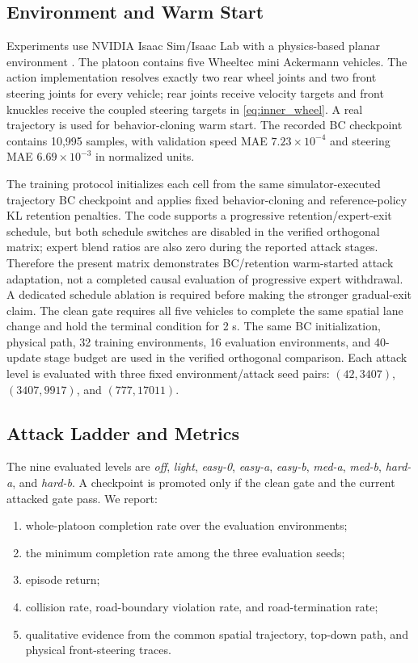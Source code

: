 \documentclass[lettersize,journal]{IEEEtran}
\begin{document}
\subsection{Environment and Warm Start}
Experiments use NVIDIA Isaac Sim/Isaac Lab with a physics-based planar environment \cite{isaacsim2022}. The platoon contains five Wheeltec mini Ackermann vehicles. The action implementation resolves exactly two rear wheel joints and two front steering joints for every vehicle; rear joints receive velocity targets and front knuckles receive the coupled steering targets in \eqref{eq:inner_wheel}. A real trajectory is used for behavior-cloning warm start. The recorded BC checkpoint contains 10,995 samples, with validation speed MAE $7.23\times10^{-4}$ and steering MAE $6.69\times10^{-3}$ in normalized units.

The training protocol initializes each cell from the same simulator-executed trajectory BC checkpoint and applies fixed behavior-cloning and reference-policy KL retention penalties. The code supports a progressive retention/expert-exit schedule, but both schedule switches are disabled in the verified orthogonal matrix; expert blend ratios are also zero during the reported attack stages. Therefore the present matrix demonstrates BC/retention warm-started attack adaptation, not a completed causal evaluation of progressive expert withdrawal. A dedicated schedule ablation is required before making the stronger gradual-exit claim. The clean gate requires all five vehicles to complete the same spatial lane change and hold the terminal condition for 2 s. The same BC initialization, physical path, 32 training environments, 16 evaluation environments, and 40-update stage budget are used in the verified orthogonal comparison. Each attack level is evaluated with three fixed environment/attack seed pairs: $(42,3407)$, $(3407,9917)$, and $(777,17011)$.

\subsection{Attack Ladder and Metrics}
The nine evaluated levels are \textit{off}, \textit{light}, \textit{easy-0}, \textit{easy-a}, \textit{easy-b}, \textit{med-a}, \textit{med-b}, \textit{hard-a}, and \textit{hard-b}. A checkpoint is promoted only if the clean gate and the current attacked gate pass. We report:
\begin{enumerate}
\item whole-platoon completion rate over the evaluation environments;
\item the minimum completion rate among the three evaluation seeds;
\item episode return;
\item collision rate, road-boundary violation rate, and road-termination rate;
\item qualitative evidence from the common spatial trajectory, top-down path, and physical front-steering traces.
\end{enumerate}
\end{document}
